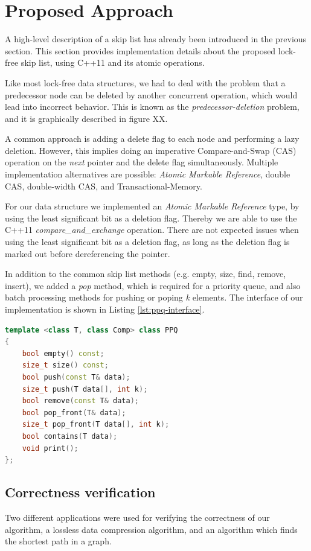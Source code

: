 \section{Proposed Approach}\label{sec:approach}
A high-level description of a skip list has already been introduced in the previous section.
This section provides implementation details about the proposed lock-free skip list, using C++11 and its atomic operations.

Like most lock-free data structures, we had to deal with the problem that a predecessor node can be deleted by another concurrent operation, which would lead into incorrect behavior. This is known as the {\em predecessor-deletion} problem, and it is graphically described in figure XX.%

A common approach is adding a delete flag to each node and performing a lazy deletion. However, this implies doing an imperative Compare-and-Swap (CAS) operation on the {\em next} pointer and the delete flag simultaneously.
Multiple implementation alternatives are possible: {\em Atomic Markable Reference}, double CAS, double-width CAS, and Transactional-Memory.

For our data structure we implemented an {\em Atomic Markable Reference} type, by using the least significant bit as a deletion flag. Thereby we are able to use the C++11 {\em compare\_and\_exchange} operation.
There are not expected issues when using the least significant bit as a deletion flag, as long as the deletion flag is marked out before dereferencing the pointer.

In addition to the common skip list methods (e.g. empty, size, find, remove, insert), we added a \textit{pop} method, which is required for a priority queue, and also batch processing methods for pushing or poping \textit{k} elements.
The interface of our implementation is shown in Listing \ref{lst:ppq-interface}.

\begin{lstlisting}[language=C++,basicstyle=\tt\footnotesize,captionpos=b,caption=PPQ interface,morekeywords={*, size_t},label=lst:ppq-interface]
template <class T, class Comp> class PPQ
{
	bool empty() const;
	size_t size() const;
	bool push(const T& data);
	size_t push(T data[], int k);
	bool remove(const T& data);
	bool pop_front(T& data);
	size_t pop_front(T data[], int k);
	bool contains(T data);
	void print();
};
\end{lstlisting}


\subsection{Correctness verification}
\label{subsec:corr_ver}
Two different applications were used for verifying the correctness of our algorithm, a lossless data compression algorithm, and an algorithm which finds the shortest path in a graph.

